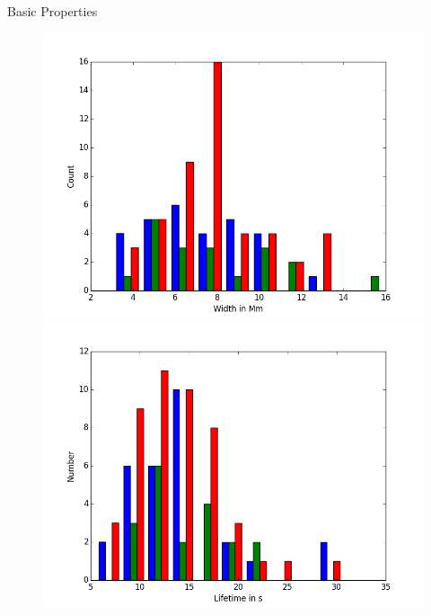 \documentclass{beamer}
\begin{document}
\begin{frame}{Basic Properties}
\begin{figure}
				\includegraphics[scale=0.20]{Figs/width_hist.png}
				\includegraphics[scale=0.20]{Figs/lt_hist.png}
		\end{figure}
	\end{frame}
	
\end{document}
